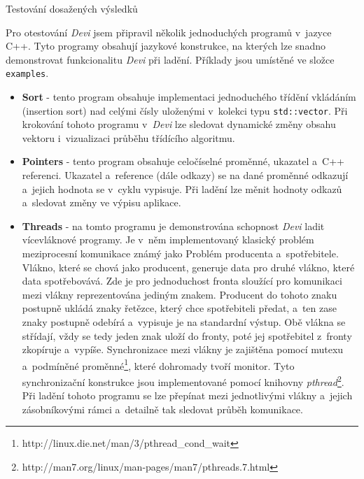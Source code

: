 \documentclass[czech,bachelor,male,python,dept460,hidelinks]{diploma}						%
\newcommand{\parspace}[1][]{
	\ifthenelse{\isempty{#1}}{\vspace{0mm}}{\vspace{#1}}
	\par
}
\begin{document}
\begin{section}{Testování dosažených výsledků}
	\parspace Pro otestování \textit{Devi} jsem připravil několik jednoduchých programů v~jazyce C++. Tyto programy obsahují jazykové konstrukce, na kterých
	lze snadno demonstrovat funkcionalitu \textit{Devi} při ladění. Příklady jsou umístěné ve složce \texttt{examples}.
	
	\begin{itemize}
		\item \textbf{Sort} - tento program obsahuje implementaci jednoduchého třídění vkládáním (insertion sort) nad celými čísly uloženými v~kolekci
		typu \texttt{std::vector}. Při krokování tohoto programu v~\textit{Devi} lze sledovat dynamické změny obsahu vektoru i~vizualizaci průběhu třídícího
		algoritmu.
		\item \textbf{Pointers} - tento program obsahuje celočíselné proměnné, ukazatel a~C++ referenci. Ukazatel a~reference (dále odkazy) se na dané proměnné
		odkazují a~jejich hodnota se v~cyklu vypisuje. Při ladění lze měnit hodnoty odkazů a~sledovat změny ve výpisu aplikace.
		\item \textbf{Threads} - na tomto programu je demonstrována schopnost \textit{Devi} ladit vícevláknové programy. Je v~něm implementovaný
		klasický problém meziprocesní komunikace známý jako Problém producenta a~spotřebitele. \cite[76]{tanenbaum} Vlákno, které se chová jako producent, generuje
		data pro druhé vlákno, které data spotřebovává. Zde je pro jednoduchost fronta sloužící pro komunikaci mezi vlákny reprezentována jediným znakem.
		Producent do tohoto znaku postupně ukládá znaky řetězce, který chce spotřebiteli předat, a~ten zase znaky postupně odebírá a~vypisuje je na standardní výstup.
		Obě vlákna se střídají, vždy se tedy jeden znak uloží do fronty, poté jej spotřebitel z~fronty zkopíruje a~vypíše. Synchronizace mezi vlákny je
		zajištěna pomocí mutexu a~podmíněné proměnné\footnote{http://linux.die.net/man/3/pthread\_cond\_wait}, které dohromady tvoří monitor.
		\cite[81]{tanenbaum} Tyto synchronizační konstrukce jsou implementované pomocí knihovny
		\textit{pthread}\footnote{http://man7.org/linux/man-pages/man7/pthreads.7.html}. Při ladění tohoto programu se lze přepínat mezi jednotlivými vlákny
		a~jejich zásobníkovými rámci a~detailně tak sledovat průběh komunikace.
	\end{itemize}
\end{section}
\end{document}
